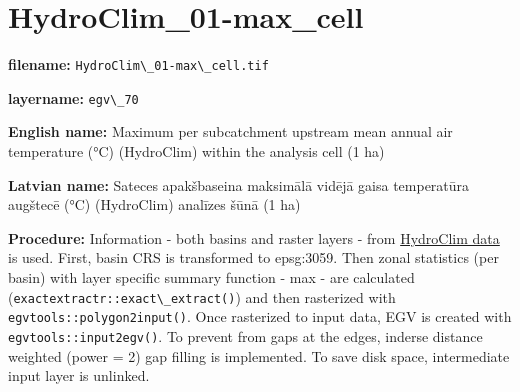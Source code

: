 \documentclass[
]{book}
\newcommand{\passthrough}[1]{#1}
\begin{document}
\section{HydroClim\_01-max\_cell}\label{ch06.070}

\textbf{filename:} \passthrough{\lstinline!HydroClim\_01-max\_cell.tif!}

\textbf{layername:} \passthrough{\lstinline!egv\_70!}

\textbf{English name:} Maximum per subcatchment upstream mean annual air temperature (°C) (HydroClim) within the analysis cell (1 ha)

\textbf{Latvian name:} Sateces apakšbaseina maksimālā vidējā gaisa temperatūra augštecē (°C) (HydroClim) analīzes šūnā (1 ha)

\textbf{Procedure:} Information - both basins and raster layers - from \hyperref[Ch04.12]{HydroClim data}
is used. First, basin CRS is transformed to epsg:3059. Then zonal statistics (per basin) with
layer specific summary function - max - are calculated (\passthrough{\lstinline!exactextractr::exact\_extract()!})
and then rasterized with \passthrough{\lstinline!egvtools::polygon2input()!}. Once rasterized to input data,
EGV is created with \passthrough{\lstinline!egvtools::input2egv()!}. To prevent from gaps at the edges,
inderse distance weighted (power = 2) gap filling is implemented. To save disk space,
intermediate input layer is unlinked.
\end{document}
